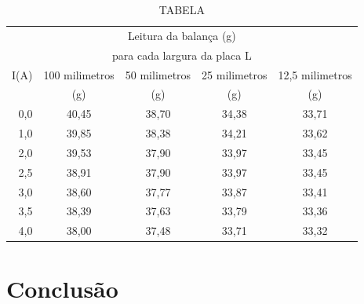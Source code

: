 \documentclass[twocolumn]{article}
\begin{document}
	\begin{table}
		\centering
		\caption{TABELA}
		\begin{tabular}[h]{r|cccc}
			\multicolumn{5}{c}{Leitura da balança (g)}\\
			\multicolumn{5}{c}{para cada largura da placa L}\\
			\hline
			I(A) & 100 milimetros & 50 milimetros & 25 milimetros & 12,5 milimetros\\
			     &   (g) &  (g) & (g) &  (g)\\
			\hline
			0,0 & 40,45 & 38,70 & 34,38 & 33,71 \\
			1,0 & 39,85 & 38,38 & 34,21 & 33,62\\
			2,0 & 39,53 & 37,90 & 33,97 & 33,45\\
			2,5 & 38,91 & 37,90 & 33,97 & 33,45\\
			3,0 & 38,60 & 37,77 & 33,87 & 33,41\\
			3,5 & 38,39 & 37,63 & 33,79 & 33,36\\
			4,0 & 38,00 & 37,48 & 33,71 & 33,32\\
			\hline
		\end{tabular}
	\end{table}




	\lipsum[3]

	\section*{Conclusão}

	\lipsum[5-6]


	

	
\end{document}
